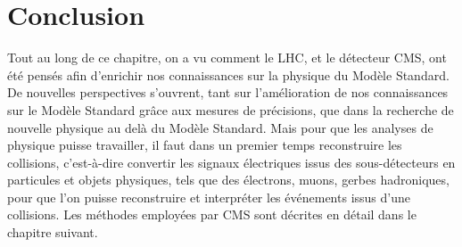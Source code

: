 \section{Conclusion}

Tout au long de ce chapitre, on a vu comment le LHC, et le détecteur CMS, ont été pensés afin d'enrichir nos connaissances sur la physique du Modèle Standard. De nouvelles perspectives s'ouvrent, tant sur l'amélioration de nos connaissances sur le Modèle Standard grâce aux mesures de précisions, que dans la recherche de nouvelle physique au delà du Modèle Standard. Mais pour que les analyses de physique puisse travailler, il faut dans un premier temps reconstruire les collisions, c'est-à-dire convertir les signaux électriques issus des sous-détecteurs en particules et objets physiques, tels que des électrons, muons, gerbes hadroniques, pour que l'on puisse reconstruire et interpréter les événements issus d'une collisions. Les méthodes employées par CMS sont décrites en détail dans le chapitre suivant.
